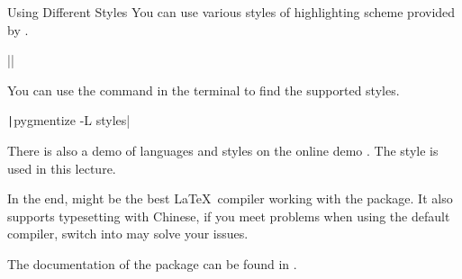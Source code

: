 \begin{frame}[fragile]{Using Different Styles}
You can use various styles of highlighting scheme provided by .
\begin{command}
\LC||
\end{command}

You can use the command in the terminal to find the supported styles. 
\begin{command}
\texttt|pygmentize -L styles|
\end{command}

There is also a demo of languages and styles on the online demo . The  style is used in this lecture. \medskip

In the end,  might be the best \LaTeX\ compiler working with the  package. It also supports typesetting with Chinese, if you meet problems when using the default  compiler, switch into  may solve your issues. \medskip

The documentation of the  package can be found in .

\end{frame}


